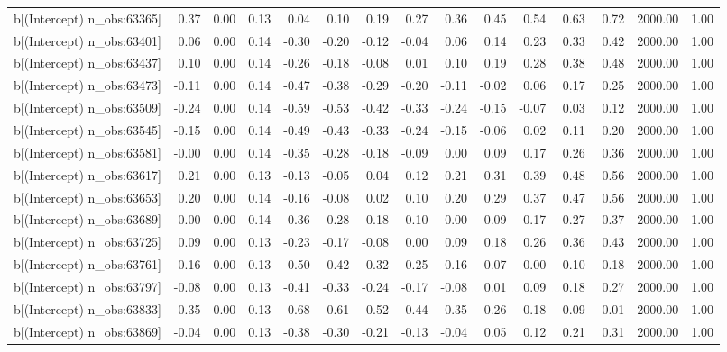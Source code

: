 \begin{table}[ht]
\begin{tabular}{rrrrrrrrrrrrrrr}
  b[(Intercept) n\_obs:63365] & 0.37 & 0.00 & 0.13 & 0.04 & 0.10 & 0.19 & 0.27 & 0.36 & 0.45 & 0.54 & 0.63 & 0.72 & 2000.00 & 1.00 \\ 
  b[(Intercept) n\_obs:63401] & 0.06 & 0.00 & 0.14 & -0.30 & -0.20 & -0.12 & -0.04 & 0.06 & 0.14 & 0.23 & 0.33 & 0.42 & 2000.00 & 1.00 \\ 
  b[(Intercept) n\_obs:63437] & 0.10 & 0.00 & 0.14 & -0.26 & -0.18 & -0.08 & 0.01 & 0.10 & 0.19 & 0.28 & 0.38 & 0.48 & 2000.00 & 1.00 \\ 
  b[(Intercept) n\_obs:63473] & -0.11 & 0.00 & 0.14 & -0.47 & -0.38 & -0.29 & -0.20 & -0.11 & -0.02 & 0.06 & 0.17 & 0.25 & 2000.00 & 1.00 \\ 
  b[(Intercept) n\_obs:63509] & -0.24 & 0.00 & 0.14 & -0.59 & -0.53 & -0.42 & -0.33 & -0.24 & -0.15 & -0.07 & 0.03 & 0.12 & 2000.00 & 1.00 \\ 
  b[(Intercept) n\_obs:63545] & -0.15 & 0.00 & 0.14 & -0.49 & -0.43 & -0.33 & -0.24 & -0.15 & -0.06 & 0.02 & 0.11 & 0.20 & 2000.00 & 1.00 \\ 
  b[(Intercept) n\_obs:63581] & -0.00 & 0.00 & 0.14 & -0.35 & -0.28 & -0.18 & -0.09 & 0.00 & 0.09 & 0.17 & 0.26 & 0.36 & 2000.00 & 1.00 \\ 
  b[(Intercept) n\_obs:63617] & 0.21 & 0.00 & 0.13 & -0.13 & -0.05 & 0.04 & 0.12 & 0.21 & 0.31 & 0.39 & 0.48 & 0.56 & 2000.00 & 1.00 \\ 
  b[(Intercept) n\_obs:63653] & 0.20 & 0.00 & 0.14 & -0.16 & -0.08 & 0.02 & 0.10 & 0.20 & 0.29 & 0.37 & 0.47 & 0.56 & 2000.00 & 1.00 \\ 
  b[(Intercept) n\_obs:63689] & -0.00 & 0.00 & 0.14 & -0.36 & -0.28 & -0.18 & -0.10 & -0.00 & 0.09 & 0.17 & 0.27 & 0.37 & 2000.00 & 1.00 \\ 
  b[(Intercept) n\_obs:63725] & 0.09 & 0.00 & 0.13 & -0.23 & -0.17 & -0.08 & 0.00 & 0.09 & 0.18 & 0.26 & 0.36 & 0.43 & 2000.00 & 1.00 \\ 
  b[(Intercept) n\_obs:63761] & -0.16 & 0.00 & 0.13 & -0.50 & -0.42 & -0.32 & -0.25 & -0.16 & -0.07 & 0.00 & 0.10 & 0.18 & 2000.00 & 1.00 \\ 
  b[(Intercept) n\_obs:63797] & -0.08 & 0.00 & 0.13 & -0.41 & -0.33 & -0.24 & -0.17 & -0.08 & 0.01 & 0.09 & 0.18 & 0.27 & 2000.00 & 1.00 \\ 
  b[(Intercept) n\_obs:63833] & -0.35 & 0.00 & 0.13 & -0.68 & -0.61 & -0.52 & -0.44 & -0.35 & -0.26 & -0.18 & -0.09 & -0.01 & 2000.00 & 1.00 \\ 
  b[(Intercept) n\_obs:63869] & -0.04 & 0.00 & 0.13 & -0.38 & -0.30 & -0.21 & -0.13 & -0.04 & 0.05 & 0.12 & 0.21 & 0.31 & 2000.00 & 1.00 \\ 

\end{tabular}
\end{table}
